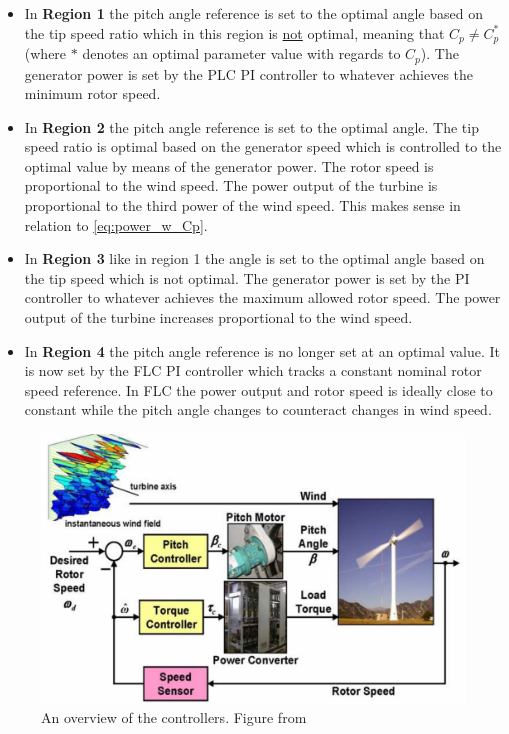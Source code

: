 \begin{itemize}
	\item In \textbf{Region 1} the pitch angle reference is set to the optimal angle based on the tip speed ratio which in this region is \underline{not} optimal, meaning that $ C_p \neq C_p^* $ (where $ * $ denotes an optimal parameter value with regards to $ C_p $). The generator power is set by the PLC PI controller to whatever achieves the minimum rotor speed.
	\item In \textbf{Region 2} the pitch angle reference is set to the optimal angle. The tip speed ratio is optimal based on the generator speed which is controlled to the optimal value by means of the generator power. The rotor speed is proportional to the wind speed. The power output of the turbine is proportional to the third power of the wind speed. This makes sense in relation to \cref{eq:power_w_Cp}.
	\item In \textbf{Region 3} like in region 1 the angle is set to the optimal angle based on the tip speed which is not optimal. The generator power is set by the PI controller to whatever achieves the maximum allowed rotor speed. The power output of the turbine increases proportional to the wind speed.
	\item In \textbf{Region 4} the pitch angle reference is no longer set at an optimal value. It is now set by the FLC PI controller which tracks a constant nominal rotor speed reference. In FLC the power output and rotor speed is ideally close to constant while the pitch angle changes to counteract changes in wind speed.
\end{itemize}

\begin{figure}[ht]
	\centering
	\includegraphics[width=0.7\linewidth]{Graphics/GraphicalWtController.PNG}
	\caption{An overview of the controllers. Figure from \cite{Pao2009}}
	\label{fig:controller_overview}
\end{figure}

